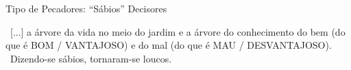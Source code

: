 \documentclass[12pt,aspectratio=169]{beamer}
\newcommand{\ver}[1]{%
    \raisebox{0.50ex}{%
        \scalebox{1.1}{%
            \pmb{\textbf{\textcolor{BSpbg}{#1}}}%
        }%
    }%
}
\newcommand{\QUOTE}[1]{%
    \par\noindent\hspace*{0.05\linewidth}%
    \begin{minipage}{0.9\linewidth}%
        \linespread{1.35}\large{#1}%
    \end{minipage}%
}
\newcommand{\RED}[1]{{\textcolor{TXred}{#1}}}
\newcommand{\YEL}[1]{{\textcolor{TXyel}{#1}}}
\begin{document}
    \begin{frame}{Tipo de Pecadores: \RED{``Sábios'' Decisores}}
        \QUOTE{%
            \ver{Gn 2.9 (ARA)}~[...] a árvore da vida no meio do jardim e a \RED{árvore do
            conhecimento do bem} (do que é BOM / \YEL{VANTAJOSO}) \RED{e do mal} (do que é MAU /
            \YEL{DESVANTAJOSO}).
            \\[\bigskipamount]
            \ver{Rm 1.22 (ARC)}~\RED{Dizendo-se} sábios, tornaram-se loucos.
        }
    \end{frame}

\end{document}

